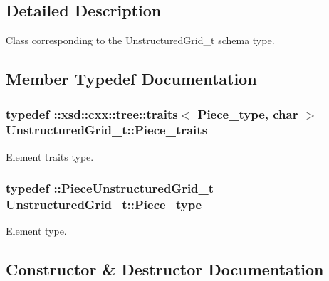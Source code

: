 \subsection{Detailed Description}
Class corresponding to the Unstructured\+Grid\+\_\+t schema type. 

\subsection{Member Typedef Documentation}
\hypertarget{classUnstructuredGrid__t_a8a9bf012c364a5fbb78aac9a319a4dad}{}
\subsubsection[{Piece\+\_\+traits}]{\setlength{\rightskip}{0pt plus 5cm}typedef \+::xsd\+::cxx\+::tree\+::traits$<$ {\bf Piece\+\_\+type}, char $>$ {\bf Unstructured\+Grid\+\_\+t\+::\+Piece\+\_\+traits}}\label{classUnstructuredGrid__t_a8a9bf012c364a5fbb78aac9a319a4dad}


Element traits type. 

\hypertarget{classUnstructuredGrid__t_a559913611314b34f4868027fc91e35bc}{}
\subsubsection[{Piece\+\_\+type}]{\setlength{\rightskip}{0pt plus 5cm}typedef \+::{\bf Piece\+Unstructured\+Grid\+\_\+t} {\bf Unstructured\+Grid\+\_\+t\+::\+Piece\+\_\+type}}\label{classUnstructuredGrid__t_a559913611314b34f4868027fc91e35bc}


Element type. 



\subsection{Constructor \& Destructor Documentation}
\hypertarget{classUnstructuredGrid__t_a00bf6957ea7e3313e2890bd4c02f8981}{}
